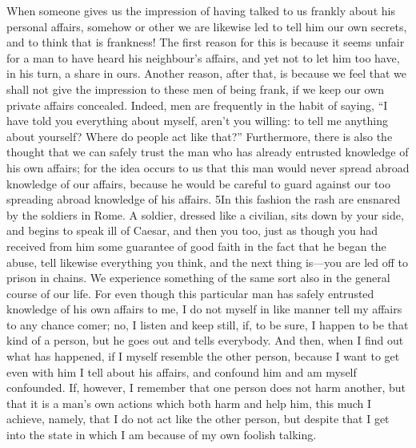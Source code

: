 When someone gives us the impression of having talked to us frankly about his personal affairs, somehow or other we are likewise led to tell him our own secrets, and to think that is frankness! The first reason for this is because it seems unfair for a man to have heard his neighbour's affairs, and yet not to let him too have, in his turn, a share in ours. Another reason, after that, is because we feel that we shall not give the impression to these men of being frank, if we keep our own private affairs concealed. Indeed, men are frequently in the habit of saying, ``I have told you everything about myself, aren't you willing: to tell me anything about yourself? Where do people act like that?'' Furthermore, there is also the thought that we can safely trust the man who has already entrusted knowledge of his own affairs; for the idea occurs to us that this man would never spread abroad knowledge of our affairs, because he would be careful to guard against our too spreading abroad knowledge of his affairs. 5In this fashion the rash are ensnared by the soldiers in Rome. A soldier, dressed like a civilian, sits down by your side, and begins to speak ill of Caesar, and then you too, just as though you had received from him some guarantee of good faith in the fact that he began the abuse, tell likewise everything you think, and the next thing is—you are led off to prison in chains. We experience something of the same sort also in the general course of our life. For even though this particular man has safely entrusted knowledge of his own affairs to me, I do not myself in like manner tell my affairs to any chance comer; no, I listen and keep still, if, to be sure, I happen to be that kind of a person, but he goes out and tells everybody. And then, when I find out what has happened, if I myself resemble the other person, because I want to get even with him I tell about his affairs, and confound him and am myself confounded. If, however, I remember that one person does not harm another, but that it is a man's own actions which both harm and help him, this much I achieve, namely, that I do not act like the other person, but despite that I get into the state in which I am because of my own foolish talking.

